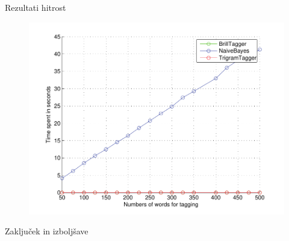 \documentclass{beamer}
\begin{document}
\begin{frame}{Rezultati hitrost}
\begin{figure}[h]
\begin{center}
\includegraphics[height=0.85\textheight]{../evaluation/graph_speed.pdf} 
\end{center}
\end{figure}
\end{frame}

\begin{frame}{Zaključek in izboljšave}
\end{frame}

\begin{frame}{}
\end{frame}
\end{document}

